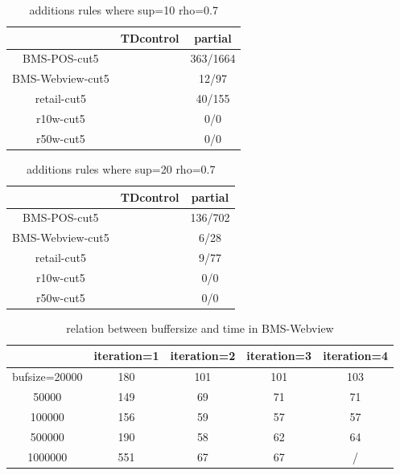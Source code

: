 \documentclass{article}
\begin{document}
\begin{table}
\begin{tabular}{|c|c|c|}
  \hline
   & TDcontrol & partial \\ \hline
  BMS-POS-cut5 &  & 363/1664  \\ \hline
  BMS-Webview-cut5 &  & 12/97 \\ \hline
  retail-cut5  &  & 40/155 \\ \hline
  r10w-cut5 &  & 0/0 \\ \hline
  r50w-cut5 & & 0/0 \\ \hline
  \hline
\end{tabular}
  \caption{additions rules where sup=10 rho=0.7}
\end{table}


\begin{table}
\begin{tabular}{|c|c|c|}
  \hline
   & TDcontrol & partial \\ \hline
  BMS-POS-cut5 &  & 136/702 \\ \hline
  BMS-Webview-cut5 &  & 6/28 \\ \hline
  retail-cut5  &  & 9/77 \\ \hline
  r10w-cut5 &   & 0/0 \\ \hline
  r50w-cut5 & & 0/0 \\ \hline
  \hline
\end{tabular}
  \caption{additions rules where sup=20 rho=0.7}
\end{table}


\begin{table}
\begin{tabular}{|c|c|c|c|c|}
  \hline
   &iteration=1 & iteration=2 & iteration=3 & iteration=4 \\\hline
  bufsize=20000 & 180 & 101 & 101 & 103 \\\hline
  50000 & 149 & 69 & 71 & 71 \\\hline
  100000 & 156 & 59 & 57 & 57 \\\hline
  500000 & 190 & 58 & 62 & 64 \\\hline
  1000000 & 551 & 67 & 67 & / \\
  \hline
  \end{tabular}
  \caption{relation between buffersize and time in BMS-Webview}
\end{table}
\end{document}
